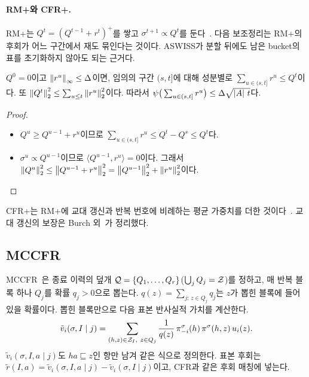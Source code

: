 \paragraph{RM+와 CFR+.}
RM+는 $Q^t=(Q^{t-1}+r^t)^+$를 쌓고 $\sigma^{t+1}\propto Q^t$를 둔다~\citep{tammelin2014solving}. 다음 보조정리는 RM+의 후회가 어느 구간에서 재도 묶인다는 것이다. ASWISS가 분할 뒤에도 남은 bucket의 표를 초기화하지 않아도 되는 근거다.
\begin{lemma}[RM+의 구간 후회]\label{lem:rmplus}
$Q^0=0$이고 $\left\lVert r^u\right\rVert_\infty\le\Delta$이면, 임의의 구간 $(s,t]$에 대해 성분별로 $\sum_{u\in(s,t]}r^u\le Q^t$이다. 또 $\left\lVert Q^t\right\rVert_2^2\le\sum_{u\le t}\left\lVert r^u\right\rVert_2^2$이다.
따라서 $\psi\big(\sum_{u\in(s,t]}r^u\big)\le\Delta\sqrt{\left\lvert A\right\rvert\,t}$다.
\end{lemma}
\begin{proof}\mbox{}
\begin{itemize}
  \item $Q^{u}\ge Q^{u-1}+r^u$이므로 $\sum_{u\in(s,t]}r^u\le Q^t-Q^s\le Q^t$다.
  \item $\sigma^u\propto Q^{u-1}$이므로 $\langle Q^{u-1},r^u\rangle=0$이다. 그래서 $\left\lVert Q^u\right\rVert_2^2\le\left\lVert Q^{u-1}+r^u\right\rVert_2^2=\left\lVert Q^{u-1}\right\rVert_2^2+\left\lVert r^u\right\rVert_2^2$이다.
\end{itemize}
\end{proof}
CFR+는 RM+에 교대 갱신과 반복 번호에 비례하는 평균 가중치를 더한 것이다~\citep{tammelin2015solving}. 교대 갱신의 보장은 Burch 외~\citep{burch2019revisiting}가 정리했다.

\subsection{MCCFR}\label{sec:bg-mccfr}
MCCFR~\citep{lanctot2009monte}은 종료 이력의 덮개 $\mathcal{Q}=\{Q_1,\dots,Q_r\}$($\bigcup_jQ_j=\mathcal{Z}$)를 정하고, 매 반복 블록 하나 $Q_j$를 확률 $q_j>0$으로 뽑는다.
$q(z)=\sum_{j:\,z\in Q_j}q_j$는 $z$가 뽑힌 블록에 들어 있을 확률이다. 뽑힌 블록만으로 다음 표본 반사실적 가치를 계산한다.
\[
\tilde v_i(\sigma,I\mid j)=\sum_{(h,z)\in\mathcal{Z}_I,\ z\in Q_j}\frac{1}{q(z)}\,\pi^\sigma_{-i}(h)\,\pi^\sigma(h,z)\,u_i(z).
\]
$\tilde v_i(\sigma,I,a\mid j)$도 $ha\sqsubseteq z$인 항만 남겨 같은 식으로 정의한다. 표본 후회는 $\tilde r(I,a)=\tilde v_i(\sigma,I,a\mid j)-\tilde v_i(\sigma,I\mid j)$이고, CFR과 같은 후회 매칭에 넣는다.

